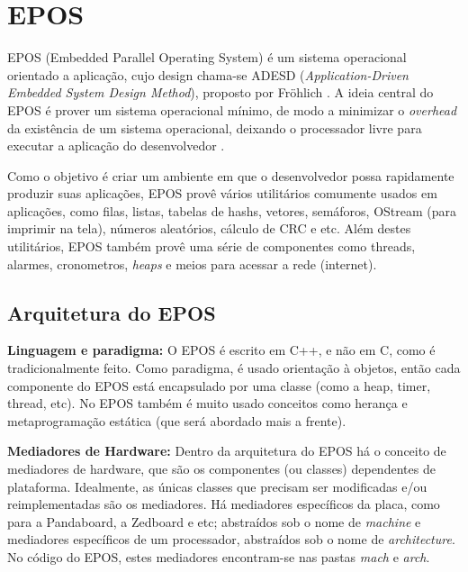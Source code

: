 \chapter{EPOS}



EPOS (Embedded Parallel Operating System) é um sistema operacional orientado a aplicação, cujo design chama-se ADESD (\emph{Application-Driven Embedded System Design Method}), proposto por Fröhlich \cite{guto_thesis}. A ideia central do EPOS é prover um sistema operacional mínimo, de modo a minimizar o \emph{overhead} da existência de um sistema operacional, deixando o processador livre para executar a aplicação do desenvolvedor \cite{epos_user_guide}.

Como o objetivo é criar um ambiente em que o desenvolvedor possa rapidamente produzir suas aplicações, EPOS provê vários utilitários comumente usados em aplicações, como filas, listas, tabelas de hashs, vetores, semáforos, OStream (para imprimir na tela), números aleatórios, cálculo de CRC e etc. Além destes utilitários, EPOS também provê uma série de componentes como threads, alarmes, cronometros, \emph{heaps} e meios para acessar a rede (internet).

\section{Arquitetura do EPOS}


\textbf{Linguagem e paradigma:} O EPOS é escrito em C++, e não em C, como é tradicionalmente feito. Como paradigma, é usado orientação à objetos, então cada componente do EPOS está encapsulado por uma classe (como a heap, timer, thread, etc). No EPOS também é muito usado conceitos como herança e metaprogramação estática (que será abordado mais a frente).

\textbf{Mediadores de Hardware:} Dentro da arquitetura do EPOS há o conceito de mediadores de hardware, que são os componentes (ou classes) dependentes de plataforma. Idealmente, as únicas classes que precisam ser modificadas e/ou reimplementadas são os mediadores. Há mediadores específicos da placa, como para a Pandaboard, a Zedboard e etc; abstraídos sob o nome de \emph{machine} e mediadores específicos de um processador, abstraídos sob o nome de \emph{architecture}. No código do EPOS, estes mediadores encontram-se nas pastas \emph{mach} e \emph{arch}.


